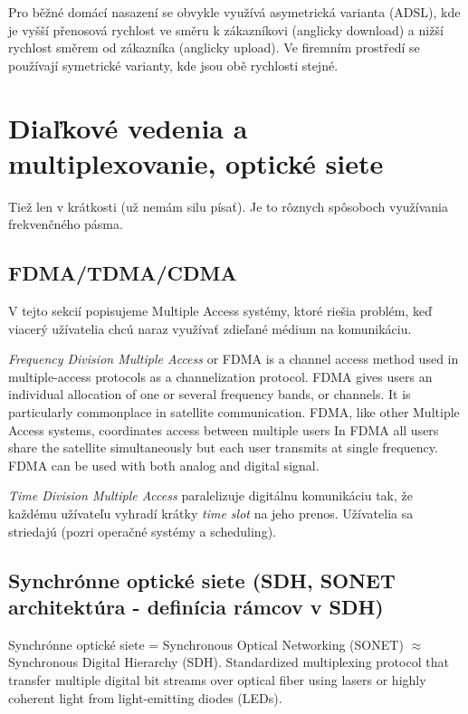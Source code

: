 \documentclass[10pt,a4paper]{article}
\begin{document}
Pro běžné domácí nasazení se obvykle využívá asymetrická varianta (ADSL), kde je vyšší přenosová rychlost ve směru k zákazníkovi (anglicky download) a nižší rychlost směrem od zákazníka (anglicky upload). Ve firemním prostředí se používají symetrické varianty, kde jsou obě rychlosti stejné.

\section{Diaľkové vedenia a multiplexovanie, optické siete}
Tiež len v krátkosti (už nemám silu písať). Je to rôznych spôsoboch využívania frekvenčného pásma. 

\subsection{FDMA/TDMA/CDMA}  

V tejto sekcií popisujeme Multiple Access systémy, ktoré riešia problém, keď viacerý užívatelia chcú naraz využívať zdieľané médium na komunikáciu. 

\emph{Frequency Division Multiple Access} or FDMA is a channel access method used in multiple-access protocols as a channelization protocol. FDMA gives users an individual allocation of one or several frequency bands, or channels. It is particularly commonplace in satellite communication. FDMA, like other Multiple Access systems, coordinates access between multiple users
In FDMA all users share the satellite simultaneously but each user transmits at single frequency.
FDMA can be used with both analog and digital signal.
              
\emph{Time Division Multiple Access} paralelizuje digitálnu komunikáciu tak, že každému užívateľu vyhradí krátky \emph{time slot} na jeho prenos. Užívatelia sa striedajú (pozri operačné systémy a scheduling). 
                         
\subsection{Synchrónne optické siete (SDH, SONET architektúra - definícia rámcov v SDH)}
Synchrónne optické siete = Synchronous Optical Networking (SONET) $\approx$ Synchronous Digital Hierarchy (SDH). 
Standardized multiplexing protocol that transfer multiple digital bit streams over optical fiber using lasers or highly coherent light from light-emitting diodes (LEDs).
\end{document}
